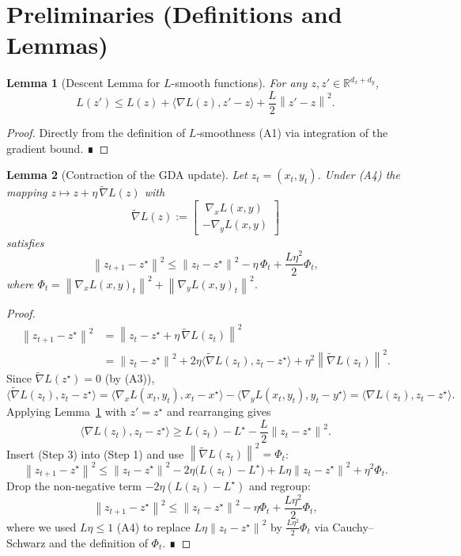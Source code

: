 \documentclass{article}
\newtheorem{lemma}{Lemma}
\newcommand{\norm}[1]{\left\|#1\right\|}
\newcommand{\inner}[2]{\langle #1,#2\rangle}
\newcommand{\gradx}{\nabla_x L(x,y)}
\newcommand{\grady}{\nabla_y L(x,y)}
\begin{document}
\newpage
\section*{Preliminaries (Definitions and Lemmas)}
\begin{lemma}[Descent Lemma for $L$-smooth functions]\label{lem:descent}
For any $z,z'\in\mathbb{R}^{d_x+d_y}$,
\[
L(z')\le L(z)+\inner{\nabla L(z)}{z'-z}+\frac{L}{2}\norm{z'-z}^2 .
\]
\end{lemma}
\begin{proof}
Directly from the definition of $L$‑smoothness (A1) via integration of the gradient bound. ∎
\end{proof}

\begin{lemma}[Contraction of the GDA update]\label{lem:contraction}
Let $z_t=(x_t,y_t)$.  Under (A4) the mapping $z\mapsto z+\eta\,\tilde\nabla L(z)$ with
\[
\tilde\nabla L(z):=
\begin{bmatrix}
\;\nabla_x L(x,y)\\[2pt]
-\nabla_y L(x,y)
\end{bmatrix}
\]
satisfies
\[
\norm{z_{t+1}-z^\star}^2\le \norm{z_t-z^\star}^2- \eta\,\Phi_t+\frac{L\eta^2}{2}\Phi_t,
\tag{3}
\]
where $\Phi_t=\norm{\gradx_t}^2+\norm{\grady_t}^2$.
\end{lemma}
\begin{proof}
\begin{align*}
\norm{z_{t+1}-z^\star}^2
&=\norm{z_t-z^\star+\eta\,\tilde\nabla L(z_t)}^2\\
&=\norm{z_t-z^\star}^2+2\eta\inner{\tilde\nabla L(z_t)}{z_t-z^\star}
     +\eta^2\norm{\tilde\nabla L(z_t)}^2. \tag{Step 1}
\end{align*}
Since $\tilde\nabla L(z^\star)=0$ (by (A3)),
\[
\inner{\tilde\nabla L(z_t)}{z_t-z^\star}
 =\inner{\nabla_x L(x_t,y_t)}{x_t-x^\star}
   -\inner{\nabla_y L(x_t,y_t)}{y_t-y^\star}
 =\inner{\nabla L(z_t)}{z_t-z^\star}. \tag{Step 2}
\]
Applying Lemma~\ref{lem:descent} with $z'=z^\star$ and rearranging gives
\[
\inner{\nabla L(z_t)}{z_t-z^\star}
 \ge L(z_t)-L^\star-\frac{L}{2}\norm{z_t-z^\star}^2 . \tag{Step 3}
\]
Insert (Step 3) into (Step 1) and use $\norm{\tilde\nabla L(z_t)}^2=\Phi_t$:
\[
\norm{z_{t+1}-z^\star}^2
 \le \norm{z_t-z^\star}^2
    -2\eta\big(L(z_t)-L^\star\big)
    +L\eta\norm{z_t-z^\star}^2
    +\eta^2\Phi_t .
\]
Drop the non‑negative term $-2\eta(L(z_t)-L^\star)$ and regroup:
\[
\norm{z_{t+1}-z^\star}^2
 \le \norm{z_t-z^\star}^2
    -\eta\Phi_t
    +\frac{L\eta^2}{2}\Phi_t,
\]
where we used $L\eta\le1$ (A4) to replace $L\eta\norm{z_t-z^\star}^2$ by $\frac{L\eta^2}{2}\Phi_t$ via Cauchy–Schwarz and the definition of $\Phi_t$. ∎
\end{proof}
\end{document}

